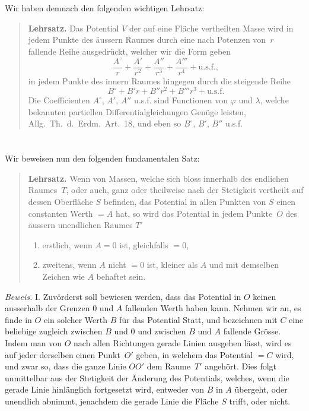 \documentclass[12pt,a4paper]{article}
\begin{document}
\section{}
Wir haben demnach den folgenden wichtigen Lehrsatz:

\begin{quote}
\textbf{Lehrsatz.} Das Potential $V$ der auf eine Fläche vertheilten Masse
wird in jedem Punkte des äussern Raumes durch eine nach Potenzen von~$r$
fallende Reihe ausgedrückt, welcher wir die Form geben
\[
\frac{A^{\circ}}{r}+\frac{A'}{r^2}+\frac{A''}{r^3}+\frac{A'''}{r^4}+\text{u.s.f.},
\]
in jedem Punkte des innern Raumes hingegen durch die steigende Reihe
\[
B^{\circ}+B'r+B''r^2+B'''r^3+\text{u.s.f.}
\]
Die Coefficienten $A^{\circ}$, $A'$, $A''$ u.s.f. sind Functionen von $\varphi$ und $\lambda$, welche bekannten
partiellen Differentialgleichungen Genüge leisten, Allg.\ Th.\ d.\ Erdm.\ Art.~18,
und eben so $B^{\circ}$, $B'$, $B''$ u.s.f.
\end{quote}

\section{}
Wir beweisen nun den folgenden fundamentalen Satz:

\begin{quote}
\textbf{Lehrsatz.} Wenn von Massen, welche sich bloss innerhalb des endlichen
Raumes~$T$, oder auch, ganz oder theilweise nach der Stetigkeit vertheilt auf dessen
Oberfläche $S$ befinden, das Potential in allen Punkten von $S$ einen constanten
Werth $=A$ hat, so wird das Potential in jedem Punkte~$O$ des äussern unendlichen
Raumes $T'$
\begin{enumerate}
\item[I.] erstlich, wenn $A=0$ ist, gleichfalls $=0$,
\item[II.] zweitens, wenn $A$ nicht $=0$ ist, kleiner als $A$ und mit demselben Zeichen
wie $A$ behaftet sein.
\end{enumerate}
\end{quote}

\textit{Beweis.} I. Zuvörderst soll bewiesen werden, dass das Potential in $O$ keinen
ausserhalb der Grenzen $0$ und $A$ fallenden Werth haben kann. Nehmen
wir an, es finde in $O$ ein solcher Werth $B$ für das Potential Statt, und bezeichnen
mit $C$ eine beliebige zugleich zwischen $B$ und $0$ und zwischen $B$ und $A$
fallende Grösse. Indem man von $O$ nach allen Richtungen gerade Linien ausgehen
lässt, wird es auf jeder derselben einen Punkt~$O'$ geben, in welchem das
Potential $=C$ wird, und zwar so, dass die ganze Linie $OO'$ dem Raume~$T'$
angehört. Dies folgt unmittelbar aus der Stetigkeit der Änderung des Potentials,
welches, wenn die gerade Linie hinlänglich fortgesetzt wird, entweder von
$B$ in $A$ übergeht, oder unendlich abnimmt, jenachdem die gerade Linie die
Fläche $S$ trifft, oder nicht.
\end{document}
